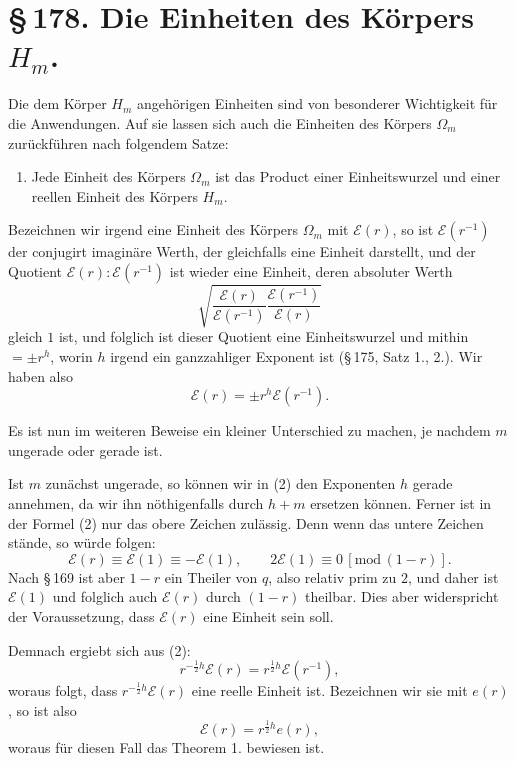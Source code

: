 \documentclass[11pt]{article}
\begin{document}
\section*{\S\,178. Die Einheiten des Körpers $H_m$.}

Die dem Körper $H_m$ angehörigen Einheiten sind von besonderer Wichtigkeit für die Anwendungen. Auf sie lassen sich auch die Einheiten des Körpers $\Omega_m$ zurückführen nach folgendem Satze:

\begin{enumerate}[label=\arabic*.,leftmargin=2.2em]
\item Jede Einheit des Körpers $\Omega_m$ ist das Product einer Einheitswurzel und einer reellen Einheit des Körpers $H_m$.
\end{enumerate}

Bezeichnen wir irgend eine Einheit des Körpers $\Omega_m$ mit $\mathscr E(r)$, so ist $\mathscr E(r^{-1})$ der conjugirt imaginäre Werth, der gleichfalls eine Einheit darstellt, und der Quotient $\mathscr E(r):\mathscr E(r^{-1})$ ist wieder eine Einheit, deren absoluter Werth
\begin{equation}
\sqrt{\frac{\mathscr E(r)}{\mathscr E(r^{-1})}\frac{\mathscr E(r^{-1})}{\mathscr E(r)}}
\tag{1}
\end{equation}
gleich $1$ ist, und folglich ist dieser Quotient eine Einheitswurzel und mithin $=\pm r^h$, worin $h$ irgend ein ganzzahliger Exponent ist (\S\,175, Satz 1., 2.). Wir haben also
\begin{equation}
\mathscr E(r)=\pm r^h\mathscr E(r^{-1}).
\tag{2}
\end{equation}

Es ist nun im weiteren Beweise ein kleiner Unterschied zu machen, je nachdem $m$ ungerade oder gerade ist.

Ist $m$ zunächst ungerade, so können wir in (2) den Exponenten $h$ gerade annehmen, da wir ihn nöthigenfalls durch $h+m$ ersetzen können. Ferner ist in der Formel (2) nur das obere Zeichen zulässig. Denn wenn das untere Zeichen stände, so würde folgen:
\[
\mathscr E(r)\equiv\mathscr E(1)\equiv-\mathscr E(1),\qquad 2\mathscr E(1)\equiv0\,[\mathrm{mod}\,(1-r)].
\]
Nach \S\,169 ist aber $1-r$ ein Theiler von $q$, also relativ prim zu $2$, und daher ist $\mathscr E(1)$ und folglich auch $\mathscr E(r)$ durch $(1-r)$ theilbar. Dies aber widerspricht der Voraussetzung, dass $\mathscr E(r)$ eine Einheit sein soll.

Demnach ergiebt sich aus (2):
\[
r^{-\frac12 h}\mathscr E(r)=r^{\frac12 h}\mathscr E(r^{-1}),
\]
woraus folgt, dass $r^{-\frac12 h}\mathscr E(r)$ eine reelle Einheit ist. Bezeichnen wir sie mit $e(r)$, so ist also
\begin{equation}
\mathscr E(r)=r^{\frac12 h}e(r),
\tag{3}
\end{equation}
woraus für diesen Fall das Theorem 1. bewiesen ist.
\end{document}
